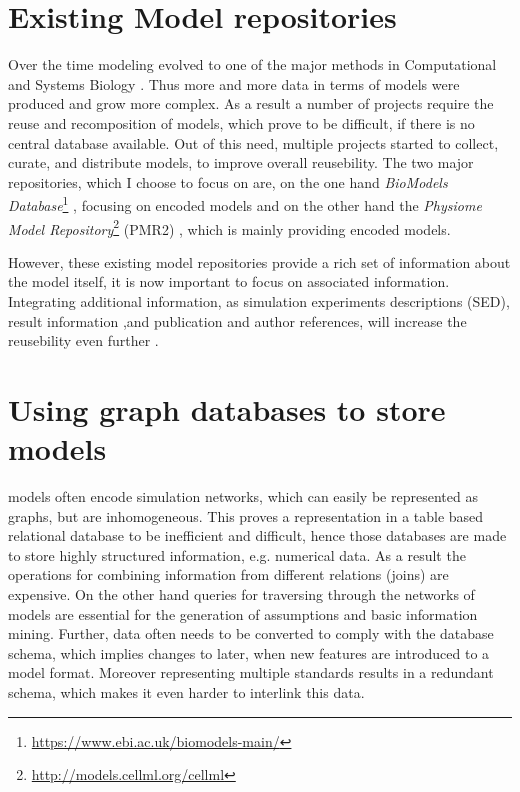 \section{Existing Model repositories}
\label{sec:background:modelrepo}
Over the time modeling evolved to one of the major methods in Computational and Systems Biology \cite{Finkelstein2004}. Thus more and more data in terms of models were produced and grow more complex. \cite{Henkel2010} As a result a number of projects require the reuse and recomposition of models, which prove to be difficult, if there is no central database available. \cite{Waltemath2013}
Out of this need, multiple projects started to collect, curate, and distribute models, to improve overall reusebility.
The two major repositories, which I choose to focus on are, on the one hand \emph{BioModels Database}\footnote{\url{https://www.ebi.ac.uk/biomodels-main/}} \cite{Li2010}, focusing on \sbml encoded models and on the other hand the \emph{Physiome Model Repository}\footnote{\url{http://models.cellml.org/cellml}} (PMR2) \cite{Yu2011}, which is mainly providing \cellml encoded models.

However, these existing model repositories provide a rich set of information about the model itself, it is now important to focus on associated information. Integrating additional information, as simulation experiments descriptions (SED), result information ,and publication and author references, will increase the reusebility even further \cite{Waltemath2013,Henkel2012}.

\section{Using graph databases to store \sysbio models}
\label{sec:backgroung:graph-db}
\sysbio models often encode simulation networks, which can easily be represented as graphs, but are inhomogeneous. This proves a representation in a table based relational database to be inefficient and difficult, hence those databases are made to store highly structured information, e.g. numerical data. As a result the operations for combining information from different relations (joins) are expensive. On the other hand queries for traversing through the networks of models are essential for the generation of assumptions and basic information mining. Further, data often needs to be converted to comply with the database schema, which implies changes to later, when new features are introduced to a model format. Moreover representing multiple standards results in a redundant schema, which makes it even harder to interlink this data. \cite{Lysenko2016}

